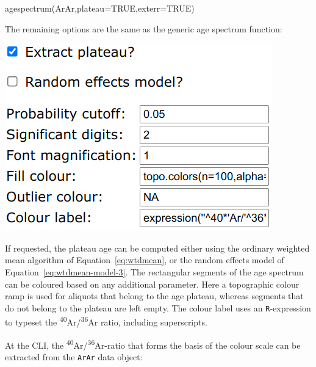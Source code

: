 \begin{refsection}
\begin{console}
agespectrum(ArAr,plateau=TRUE,exterr=TRUE)
\end{console}

The remaining options are the same as the generic age spectrum
function:\\

\noindent\begin{minipage}[t]{.4\linewidth}
\strut\vspace*{-\baselineskip}\newline
\includegraphics[width=\linewidth]{../figures/ArArAgeSpectrumOtherOptions.png}\\
\end{minipage}
\begin{minipage}[t]{.6\linewidth}
  If requested, the plateau age can be computed either using the
  ordinary weighted mean algorithm of Equation~\ref{eq:wtdmean}, or
  the random effects model of Equation~\ref{eq:wtdmean-model-3}.  The
  rectangular segments of the age spectrum can be coloured based on
  any additional parameter. Here a topographic colour ramp is used for
  aliquots that belong to the age plateau, whereas segments that do
  not belong to the plateau are left empty. The colour label uses an
  \texttt{R}-expression to typeset the
  \textsuperscript{40}Ar/\textsuperscript{36}Ar ratio, including
  superscripts.
\end{minipage}

At the CLI, the \textsuperscript{40}Ar/\textsuperscript{36}Ar-ratio
that forms the basis of the colour scale can be extracted from the
\texttt{ArAr} data object:

  

\end{refsection}
